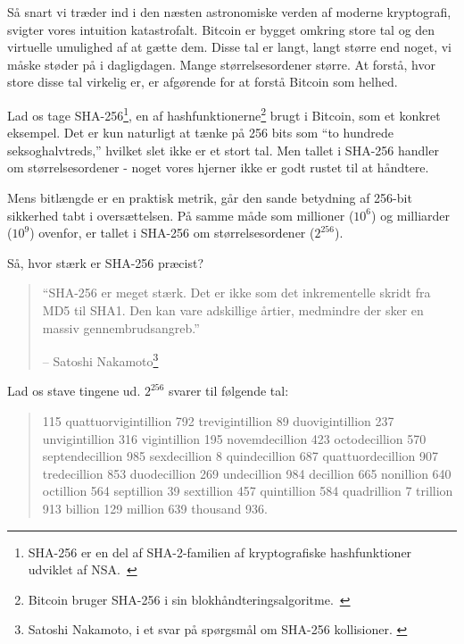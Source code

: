 Så snart vi træder ind i den næsten astronomiske verden af moderne kryptografi, svigter vores intuition katastrofalt. Bitcoin er bygget omkring store tal og den virtuelle umulighed af at gætte dem. Disse tal er langt, langt større end noget, vi måske støder på i dagligdagen. Mange størrelsesordener større. At forstå, hvor store disse tal virkelig er, er afgørende for at forstå Bitcoin som helhed.

Lad os tage SHA-256\footnote{SHA-256 er en del af SHA-2-familien af kryptografiske hashfunktioner udviklet af NSA.~\cite{wiki:sha2}}, en af hashfunktionerne\footnote{Bitcoin bruger SHA-256 i sin blokhåndteringsalgoritme.~\cite{btcwiki:block-hashing}} brugt i Bitcoin, som et konkret eksempel. Det er kun naturligt at tænke på 256 bits som \enquote{to hundrede seksoghalvtreds,} hvilket slet ikke er et stort tal. Men tallet i SHA-256 handler om størrelsesordener - noget vores hjerner ikke er godt rustet til at håndtere.

Mens bitlængde er en praktisk metrik, går den sande betydning af 256-bit sikkerhed tabt i oversættelsen. På samme måde som millioner ($10^6$) og milliarder ($10^9$) ovenfor, er tallet i SHA-256 om størrelsesordener ($2^{256}$).

Så, hvor stærk er SHA-256 præcist?

\begin{quotation}\begin{samepage}
\enquote{SHA-256 er meget stærk. Det er ikke som det inkrementelle skridt fra MD5
til SHA1. Den kan vare adskillige årtier, medmindre der sker en massiv
gennembrudsangreb.}
\begin{flushright} -- Satoshi Nakamoto\footnote{Satoshi Nakamoto, i et svar på spørgsmål om SHA-256 kollisioner. \cite{satoshi-sha256}}
\end{flushright}\end{samepage}\end{quotation}

Lad os stave tingene ud. $2^{256}$ svarer til følgende tal:

\begin{quotation}\begin{samepage}
    115 quattuorvigintillion 792 trevigintillion 89 duovigintillion 237
    unvigintillion 316 vigintillion 195 novemdecillion 423 octodecillion 570
    septendecillion 985 sexdecillion 8 quindecillion 687 quattuordecillion 907
    tredecillion 853 duodecillion 269 undecillion 984 decillion 665 nonillion
    640 octillion 564 septillion 39 sextillion 457 quintillion 584 quadrillion 7
    trillion 913 billion 129 million 639 thousand 936.
\end{samepage}\end{quotation}

